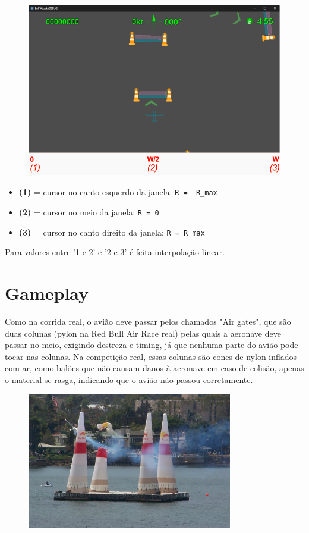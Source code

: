 \begin{figure}[h]
    \centering
    \includegraphics[width=\textwidth]{mouse-x.png}
\end{figure}

\begin{itemize}
\item \textbf{(1)} = cursor no canto esquerdo da janela: \texttt{R = -R\_max}
\item \textbf{(2)} = cursor no meio da janela: \texttt{R = 0}
\item \textbf{(3)} = cursor no canto direito da janela: \texttt{R = R\_max}
\end{itemize}

Para valores entre '1 e 2' e '2 e 3' é feita interpolação linear.

\section*{Gameplay}
Como na corrida real, o avião deve passar pelos chamados "Air gates", que são duas colunas (pylon na Red Bull Air Race real) pelas quais a aeronave deve passar no meio, exigindo destreza e timing, já que nenhuma parte do avião pode tocar nas colunas. Na competição real, essas colunas são cones de nylon inflados com ar, como balões que não causam danos à aeronave em caso de colisão, apenas o material se rasga, indicando que o avião não passou corretamente.

\begin{figure}[h]
    \centering
    \includegraphics[width=0.8\textwidth]{red-bull-2.jpg}
\end{figure}

